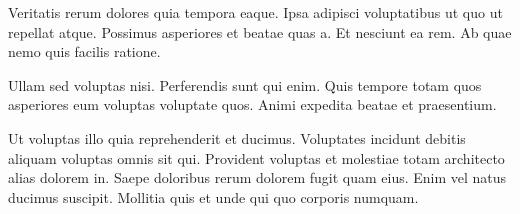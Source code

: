 \documentclass[a4paper]{article}
\begin{document}
\begin{multicols}{2}
Veritatis rerum dolores quia tempora eaque. Ipsa adipisci voluptatibus ut quo ut
    repellat atque. Possimus asperiores et beatae quas a. Et nesciunt ea rem. Ab
    quae nemo quis facilis ratione.

Ullam sed voluptas nisi. Perferendis sunt qui enim. Quis tempore totam quos
    asperiores eum voluptas voluptate quos. Animi expedita beatae et
    praesentium.

Ut voluptas illo quia reprehenderit et ducimus. Voluptates incidunt debitis
    aliquam voluptas omnis sit qui. Provident voluptas et molestiae totam
    architecto alias dolorem in. Saepe doloribus rerum dolorem fugit quam eius.
    Enim vel natus ducimus suscipit. Mollitia quis et unde qui quo corporis
    numquam.

\end{multicols}
\end{document}

